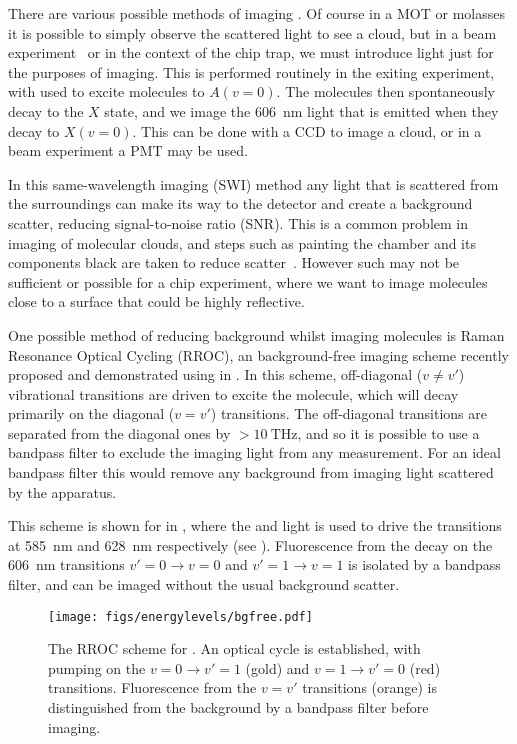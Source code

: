 There are various possible methods of imaging \CaF{}. Of course in a MOT or
molasses it is possible to simply observe the scattered light to see a cloud,
but in a beam experiment~\cite{} or in the context of the chip trap, we must
introduce light just for the purposes of imaging. This is performed routinely
in the exiting experiment, with  used to excite molecules to
$A(v=0)$. The molecules then spontaneously decay to the $X$ state, and we image
the \SI{606}{\nano\meter} light that is emitted when they decay to $X(v=0)$.
This can be done with a CCD to image a cloud, or in a beam experiment a PMT
may be used. 

In this same-wavelength imaging (SWI) method any light that is scattered from
the surroundings can make its way to the detector and create a background
scatter, reducing signal-to-noise ratio (SNR). This is a common problem in
imaging of molecular clouds, and steps such as painting the chamber and its
components black are taken to reduce scatter~\cite{}. However such 
may not be sufficient or possible for a chip experiment, where we want to image
molecules close to a surface that could be highly reflective.

One possible method of reducing background whilst imaging molecules is Raman
Resonance Optical Cycling (RROC), an background-free imaging scheme recently
proposed and demonstrated using \SrF{} in . In this scheme,
off-diagonal ($v\neq v'$) vibrational transitions are driven to excite the
molecule, which will decay primarily on the diagonal ($v=v'$) transitions. The
off-diagonal transitions are separated from the diagonal ones by
$>\SI{10}{\tera\hertz}$, and so it is possible to use a bandpass filter to
exclude the imaging light from any measurement. For an ideal bandpass filter
this would remove any background from imaging light scattered by the apparatus.

This scheme is shown for \CaF{} in , where
the  and  light is used to drive the transitions at
\SI{585}{\nano\meter} and \SI{628}{\nano\meter} respectively (see
). Fluorescence from the decay on the
\SI{606}{\nano\meter} transitions $v'=0\rightarrow v=0$ and $v'=1\rightarrow
v=1$ is isolated by a bandpass filter, and can be imaged without the usual
background scatter.

\begin{figure}
  \centering
  \texttt{[image: figs/energylevels/bgfree.pdf]}
  \caption{
  The RROC scheme for \CaF{}. An optical cycle is established, with pumping on
  the $v=0 \rightarrow v'=1$ (gold) and $v=1 \rightarrow v'=0$ (red) transitions.
  Fluorescence from the $v=v'$ transitions (orange) is distinguished from the
  background by a bandpass filter before imaging.
  }
  \label{exper:fig:bgfreelevels}
\end{figure}

